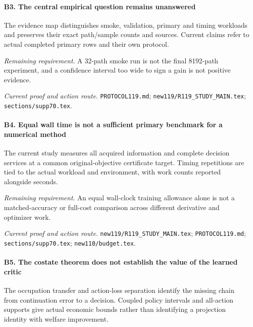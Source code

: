 \paragraph{B3. The central empirical question remains unanswered}

The evidence map distinguishes smoke, validation, primary and timing workloads and preserves their exact path/\allowbreak{}sample counts and sources. Current claims refer to actual completed primary rows and their own protocol.

\par\emph{Remaining requirement.} A 32-path smoke run is not the final 8192-path experiment, and a confidence interval too wide to sign a gain is not positive evidence.

\par\emph{Current proof and action route.} \nolinkurl{PROTOCOL119.md}; \nolinkurl{new119/R119_STUDY_MAIN.tex}; \nolinkurl{sections/supp70.tex}.

\paragraph{B4. Equal wall time is not a sufficient primary benchmark for a numerical method}

The current study measures all acquired information and complete decision services at a common original-objective certificate target. Timing repetitions are tied to the actual workload and environment, with work counts reported alongside seconds.

\par\emph{Remaining requirement.} An equal wall-clock training allowance alone is not a matched-accuracy or full-cost comparison across different derivative and optimizer work.

\par\emph{Current proof and action route.} \nolinkurl{new119/R119_STUDY_MAIN.tex}; \nolinkurl{PROTOCOL119.md}; \nolinkurl{sections/supp70.tex}; \nolinkurl{new110/budget.tex}.

\paragraph{B5. The costate theorem does not establish the value of the learned critic}

The occupation transfer and action-loss separation identify the missing chain from continuation error to a decision. Coupled policy intervals and all-action supports give actual economic bounds rather than identifying a projection identity with welfare improvement.

